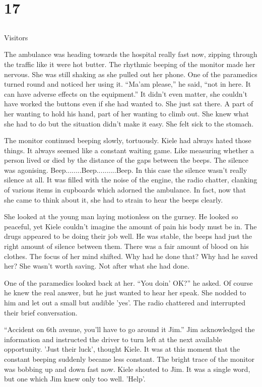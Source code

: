 \chapter{17}
\section{}
Visitors  

The ambulance was heading towards the hospital really fast now, zipping through the traffic like it were hot butter.  The rhythmic beeping of the monitor made her nervous.  She was still shaking as she pulled out her phone.  One of the paramedics turned round and noticed her using it.  ``Ma'am please,'' he said, ``not in here.  It can have adverse effects on the equipment.''  It didn't even matter, she couldn't have worked the buttons even if she had wanted to.  She just sat there.  A part of her wanting to hold his hand, part of her wanting to climb out.  She knew what she had to do but the situation didn't make it easy.  She felt sick to the stomach.  

The monitor continued beeping slowly, tortuously.  Kiele had always hated those things.  It always seemed like a constant waiting game.  Like measuring whether a person lived or died by the distance of the gaps between the beeps.  The silence was agonising.  Beep........Beep..........Beep.  In this case the silence wasn't really silence at all.  It was filled with the noise of the engine, the radio chatter, clanking of various items in cupboards which adorned the ambulance.  In fact, now that she came to think about it, she had to strain to hear the beeps clearly.

She looked at the young man laying motionless on the gurney.  He looked so peaceful, yet Kiele couldn't imagine the amount of pain his body must be in.  The drugs appeared to be doing their job well.  He was stable, the beeps had just the right amount of silence between them.  There was a fair amount of blood on his clothes.  The focus of her mind shifted.  Why had he done that?  Why had he saved her?  She wasn't worth saving.  Not after what she had done.

One of the paramedics looked back at her.  ``You doin' OK?'' he asked.  Of course he knew the real answer, but he just wanted to hear her speak.  She nodded to him and let out a small but audible 'yes'.  The radio chattered and interrupted their brief conversation.

``Accident on 6th avenue, you'll have to go around it Jim.''  Jim acknowledged the information and instructed the driver to turn left at the next available opportunity.  'Just their luck', thought Kiele.  It was at this moment that the constant beeping suddenly became less constant.  The bright trace of the monitor was bobbing up and down fast now.  Kiele shouted to Jim.  It was a single word, but one which Jim knew only too well.  'Help'.

